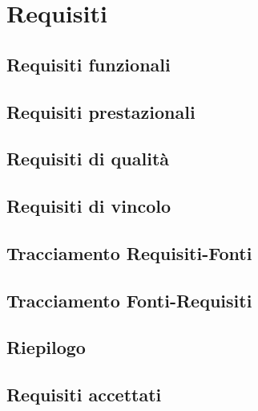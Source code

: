 %


\section{Requisiti}

\subsection{Requisiti funzionali}

\subsection{Requisiti prestazionali}

\subsection{Requisiti di qualità}

\subsection{Requisiti di vincolo}

\subsection{Tracciamento Requisiti-Fonti}

\subsection{Tracciamento Fonti-Requisiti}

\subsection{Riepilogo}

\subsection{Requisiti accettati}
